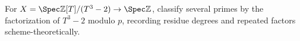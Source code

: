 \begin{problem}\label{chall:vi25-02}
For $X=\Spec\mathbb Z[T]/(T^3-2)\to\Spec\mathbb Z$, classify several primes by the factorization of $T^3-2$ modulo $p$, recording residue degrees and repeated factors scheme-theoretically.
\end{problem}

